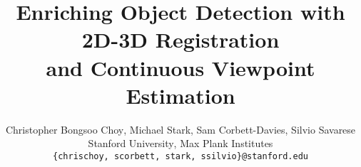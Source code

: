\documentclass[10pt,twocolumn,letterpaper]{article}
\begin{document}
\title{Enriching Object Detection with 2D-3D Registration\\and Continuous Viewpoint Estimation}

\author{Christopher Bongsoo Choy\textsuperscript{\dag}, Michael Stark\textsuperscript{\dag \ddag}, Sam Corbett-Davies\textsuperscript{\dag}, Silvio Savarese\textsuperscript{\dag}\\
    Stanford University\textsuperscript{\dag}, Max Plank Institutes\textsuperscript{\ddag}\\
    {\tt\small \{chrischoy, scorbett, stark, ssilvio\}@stanford.edu}
}

\maketitle
\end{document}
